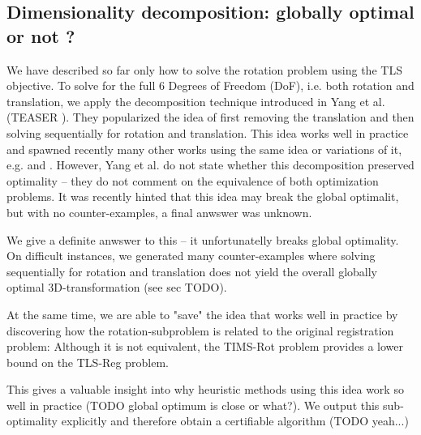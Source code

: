 
\subsection{Dimensionality decomposition: globally optimal or not ?}
We have described so far only how to solve the rotation problem using the TLS objective. To solve for the full 6 Degrees of Freedom (DoF), i.e. both rotation and translation, we apply the decomposition technique introduced in Yang et al. (TEASER \cite{Yang20tro-teaser}). They popularized the idea of first removing the translation and then solving sequentially for rotation and translation. This idea works well in practice and spawned recently many other works using the same idea or variations of it, e.g. \cite{Yang20tro-teaser} \cite{10432947} and \cite{9878458} \cite{9879801}. However, Yang et al. do not state whether this decomposition preserved optimality -- they do not comment on the equivalence of both optimization problems. It was recently hinted that this idea may break the global optimalit, but with no counter-examples, a final anwswer was unknown. 

We give a definite anwswer to this -- it unfortunatelly breaks global optimality. 
On difficult instances, we generated many counter-examples where solving sequentially for rotation and translation does not yield the overall globally optimal 3D-transformation (see sec TODO).

At the same time, we are able to "save" the idea that works well in practice by discovering how the rotation-subproblem is related to the original registration problem: Although it is not equivalent, the TIMS-Rot problem provides a lower bound on the TLS-Reg problem.

This gives a valuable insight into why heuristic methods using this idea work so well in practice (TODO global optimum is close or what?). 
We output this sub-optimality explicitly and therefore obtain a certifiable algorithm (TODO yeah...)\\